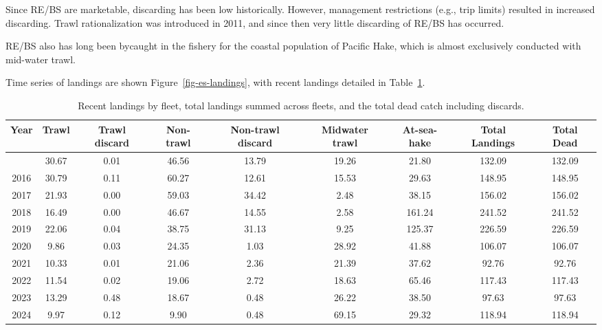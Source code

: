 \documentclass[
]{article}
\begin{document}
Since RE/BS are marketable, discarding has been low historically.
However, management restrictions (e.g., trip limits) resulted in
increased discarding. Trawl rationalization was introduced in 2011, and
since then very little discarding of RE/BS has occurred.

RE/BS also has long been bycaught in the fishery for the coastal
population of Pacific Hake, which is almost exclusively conducted with
mid-water trawl.

Time series of landings are shown Figure~\ref{fig-es-landings}, with
recent landings detailed in Table~\ref{tbl-es-catches}.

\begingroup
\fontsize{8.0pt}{9.0pt}\selectfont

\begin{longtable}{ccccccccc}

\caption{\label{tbl-es-catches}Recent landings by fleet, total landings
summed across fleets, and the total dead catch including discards.}

\tabularnewline

\toprule
Year & Trawl & Trawl 
 discard & Non-trawl & Non-trawl 
 discard & Midwater 
 trawl & At-sea-hake & Total Landings & Total Dead \\ 
\midrule\addlinespace[2.5pt]
2015 & 30.67 & 0.01 & 46.56 & 13.79 & 19.26 & 21.80 & 132.09 & 132.09 \\ 
2016 & 30.79 & 0.11 & 60.27 & 12.61 & 15.53 & 29.63 & 148.95 & 148.95 \\ 
2017 & 21.93 & 0.00 & 59.03 & 34.42 & 2.48 & 38.15 & 156.02 & 156.02 \\ 
2018 & 16.49 & 0.00 & 46.67 & 14.55 & 2.58 & 161.24 & 241.52 & 241.52 \\ 
2019 & 22.06 & 0.04 & 38.75 & 31.13 & 9.25 & 125.37 & 226.59 & 226.59 \\ 
2020 & 9.86 & 0.03 & 24.35 & 1.03 & 28.92 & 41.88 & 106.07 & 106.07 \\ 
2021 & 10.33 & 0.01 & 21.06 & 2.36 & 21.39 & 37.62 & 92.76 & 92.76 \\ 
2022 & 11.54 & 0.02 & 19.06 & 2.72 & 18.63 & 65.46 & 117.43 & 117.43 \\ 
2023 & 13.29 & 0.48 & 18.67 & 0.48 & 26.22 & 38.50 & 97.63 & 97.63 \\ 
2024 & 9.97 & 0.12 & 9.90 & 0.48 & 69.15 & 29.32 & 118.94 & 118.94 \\ 
\bottomrule

\end{longtable}
\end{document}
